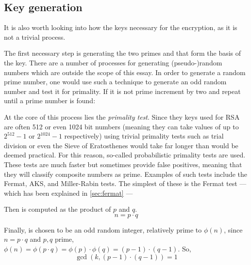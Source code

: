 \documentclass[12pt, titlepage]{article}
\begin{document}
    \subsection{Key generation}
    It is also worth looking into how the keys necessary for the encryption, as it is not a
    trivial process.

    The first necessary step is generating the two primes  and  that form
    the basis of the key. There are a number of processes for generating (pseudo-)random
    numbers which are outside the scope of this essay. In order to generate a random prime
    number, one would use such a technique to generate an odd random number and test it for
    primality.  If it is not prime increment by two and repeat until a prime number is
    found:
    
    \begin{figure}[H]
    \end{figure}

    At the core of this process lies the \emph{primality test}. Since they keys used for RSA
    are often 512 or even 1024 bit numbers (meaning they can take values of up to $2^{512} -
    1$ or $2^{1024} - 1$ respectively) using trivial primality tests such as trial division
    or even the Sieve of Eratosthenes would take far longer than would be deemed practical.
    For this reason, so-called probabilistic primality tests are used. These tests are much
    faster but sometimes provide false positives, meaning that they will classify composite
    numbers as prime. Examples of such tests include the Fermat, AKS, and Miller-Rabin
    tests. The simplest of these is the Fermat test --- which has been explained in
    \autoref{sec:fermat} --- 
    
    Then  is computed as the product of $p$ and $q$. $$n=p \cdot q$$
    
    Finally,  is chosen to be an odd random integer, relatively prime to $\phi(n)$,
    since $n=p \cdot q$ and $p,q$ prime, $\phi(n) = \phi(p \cdot q) = \phi(p) \cdot \phi(q)
    = (p-1) \cdot (q-1)$. So, 
    \begin{equation*}
        \gcd(k, (p-1) \cdot (q-1)) = 1
    \end{equation*}



\printbibliography
\end{document}
